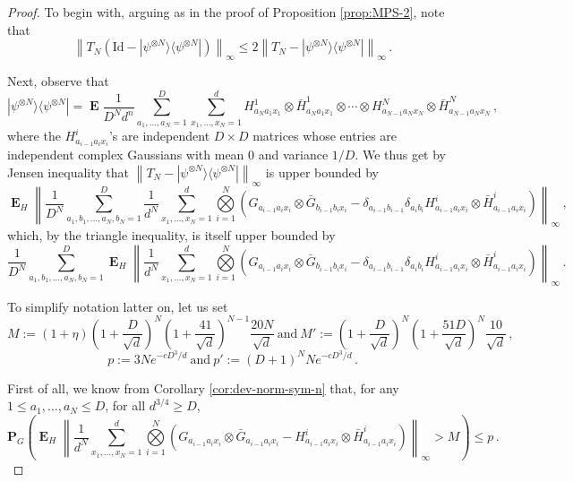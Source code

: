\documentclass{amsart}
\renewcommand{\P}{\mathbf{P}}
\renewcommand{\leq}{\leqslant}
\renewcommand{\geq}{\geqslant}
\newcommand{\Id}{\mathrm{Id}}
\DeclareMathOperator{\E}{\mathbf{E}}
\newcommand{\ketbra}[2]{| #1 \rangle\!\langle #2 |}
\begin{document}
\begin{proof}
    To begin with, arguing as in the proof of Proposition \ref{prop:MPS-2}, note that
    \begin{equation} \label{eq:T-psi-PEPS}
        \left\|T_N(\Id-\ketbra{\psi^{\otimes N}}{\psi^{\otimes N}})\right\|_{\infty} \leq 2 \left\|T_N-\ketbra{\psi^{\otimes N}}{\psi^{\otimes N}}\right\|_{\infty} \, .
    \end{equation}

    Next, observe that
    \[ \ketbra{\psi^{\otimes N}}{\psi^{\otimes N}} = \E \frac{1}{D^Nd^n} \sum_{a_1,\ldots,a_N=1}^D \sum_{x_1,\ldots,x_N=1}^d H_{a_Na_1x_1}^1 \otimes \bar{H}_{a_Na_1x_1}^1\otimes \cdots\otimes H_{a_{N-1}a_Nx_N}^N \otimes \bar{H}_{a_{N-1}a_Nx_N}^N \, , \]
    where the $H_{a_{i-1}a_ix_i}^i$'s are independent $D\times D$ matrices whose entries are independent complex Gaussians with mean $0$ and variance $1/D$.
    We thus get by Jensen inequality that $\left\|T_N-\ketbra{\psi^{\otimes N}}{\psi^{\otimes N}}\right\|_{\infty}$ is upper bounded by
    \[ \E_H \left\| \frac{1}{D^N} \sum_{a_1,b_1,\ldots,a_N,b_N=1}^D \frac{1}{d^N} \sum_{x_1,\ldots,x_N=1}^d \underset{i=1}{\overset{N}{\bigotimes}}\left( G_{a_{i-1}a_ix_i} \otimes \bar{G}_{b_{i-1}b_ix_i} - \delta_{a_{i-1}b_{i-1}}\delta_{a_ib_i}H_{a_{i-1}a_ix_i}^i \otimes \bar{H}_{a_{i-1}a_ix_i}^i \right) \right\|_{\infty} \, , \]
    which, by the triangle inequality, is itself upper bounded by
    \[  \frac{1}{D^N} \sum_{a_1,b_1,\ldots,a_N,b_N=1}^D \E_H \left\| \frac{1}{d^N} \sum_{x_1,\ldots,x_N=1}^d \underset{i=1}{\overset{N}{\bigotimes}}\left( G_{a_{i-1}a_ix_i} \otimes \bar{G}_{b_{i-1}b_ix_i} - \delta_{a_{i-1}b_{i-1}}\delta_{a_ib_i}H_{a_{i-1}a_ix_i}^i \otimes \bar{H}_{a_{i-1}a_ix_i}^i \right) \right\|_{\infty} \, . \]

    To simplify notation latter on, let us set
    \[ M:= (1+\eta) \left(1+\frac{D}{\sqrt{d}}\right)^N \left(1+\frac{41}{\sqrt{d}}\right)^{N-1}\frac{20N}{\sqrt{d}} \ \text{and}\ M':= \left(1+\frac{D}{\sqrt{d}}\right)^N \left(1+\frac{51D}{\sqrt{d}}\right)^N\frac{10}{\sqrt{d}} \, , \]
    \[ p:=3Ne^{-cD^3/d} \ \text{and}\ p':= (D+1)^{N} Ne^{-cD^3/d} \, . \]

    First of all, we know from Corollary \ref{cor:dev-norm-sym-n} that, for any $1\leq a_1,\ldots,a_N\leq D$, for all $d^{3/4}\geq D$,
    \begin{equation} \label{eq:dev1} \P_G \left( \E_H \left\| \frac{1}{d^N} \sum_{x_1,\ldots,x_N=1}^d \underset{i=1}{\overset{N}{\bigotimes}}\left( G_{a_{i-1}a_ix_i} \otimes \bar{G}_{a_{i-1}a_ix_i} - H_{a_{i-1}a_ix_i}^i \otimes \bar{H}_{a_{i-1}a_ix_i}^i \right) \right\|_{\infty} > M \right) \leq p \, . \end{equation}


\end{proof}
\end{document}
